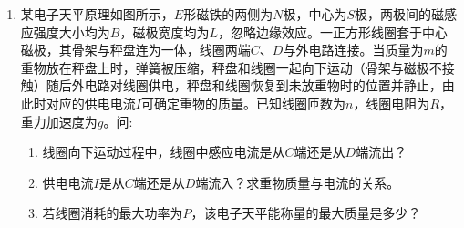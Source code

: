 \begin{enumerate}




\newpage
\item
{}
某电子天平原理如图所示，$ E $形磁铁的两侧为$ N $极，中心为$ S $极，两极间的磁感应强度大小均为$ B $，磁极宽度均为$ L $，忽略边缘效应。一正方形线圈套于中心磁极，其骨架与秤盘连为一体，线圈两端$ C $、$ D $与外电路连接。当质量为$ m $的重物放在秤盘上时，弹簧被压缩，秤盘和线圈一起向下运动（骨架与磁极不接触）随后外电路对线圈供电，秤盘和线圈恢复到未放重物时的位置并静止，由此时对应的供电电流$ I $可确定重物的质量。已知线圈匝数为$ n $，线圈电阻为$ R $，重力加速度为$ g $。问:
\begin{enumerate}
\renewcommand{\labelenumi}{\arabic{enumi}.}
\item
线圈向下运动过程中，线圈中感应电流是从$ C $端还是从$ D $端流出？
\item 
供电电流$ I $是从$ C $端还是从$ D $端流入？求重物质量与电流的关系。
\item 
若线圈消耗的最大功率为$ P $，该电子天平能称量的最大质量是多少？



\end{enumerate}
\begin{figure}[h!]
\flushright
  
\end{figure}


\end{enumerate}

